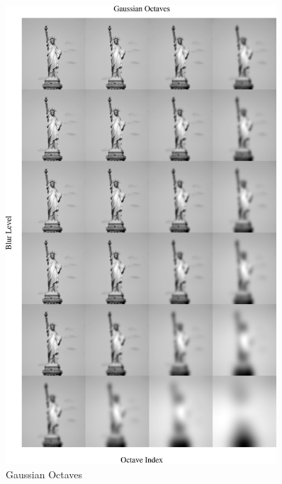 \documentclass[11pt,a4paper]{article}
\begin{document}
\begin{figure}[ht!]
  \centering
  \begin{minipage}{0.45\textwidth}
    \centering
    \includegraphics[width=0.9\textwidth]{figs/gaussian_octaves.png} %
    \caption{Gaussian Octaves}
  \end{minipage}
  \quad
  \begin{minipage}{0.45\textwidth}
    \centering

\end{minipage}
\end{figure}
\end{document}
